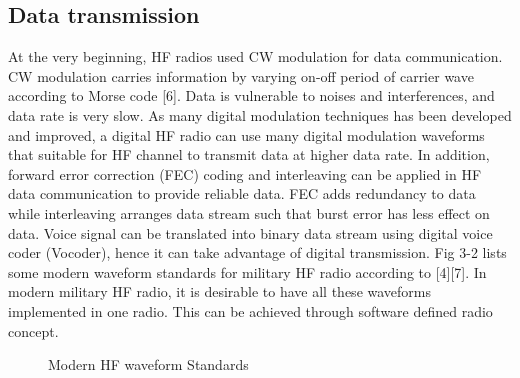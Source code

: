 \documentclass[conference]{IEEEtran}
\begin{document}
\subsection{Data transmission}
At the very beginning, HF radios used CW modulation for data communication. CW modulation carries information by varying on-off period of carrier wave according to Morse code [6]. Data is vulnerable to noises and interferences, and data rate is very slow. As many digital modulation techniques has been developed and improved, a digital HF radio can use many digital modulation waveforms that suitable for HF channel to transmit data at higher data rate. In addition, forward error correction (FEC) coding and interleaving can be applied in HF data communication to provide reliable data. FEC adds redundancy to data while interleaving arranges data stream such that burst error has less effect on data. Voice signal can be translated into binary data stream using digital voice coder (Vocoder), hence it can take advantage of digital transmission. Fig 3-2 lists some modern waveform standards for military HF radio according to [4][7]. In modern military HF radio, it is desirable to have all these waveforms implemented in one radio. This can be achieved through software defined radio concept.
\begin{figure}[h!]
	\centering
	\caption{Modern HF waveform Standards}
\end{figure}
\end{document}
